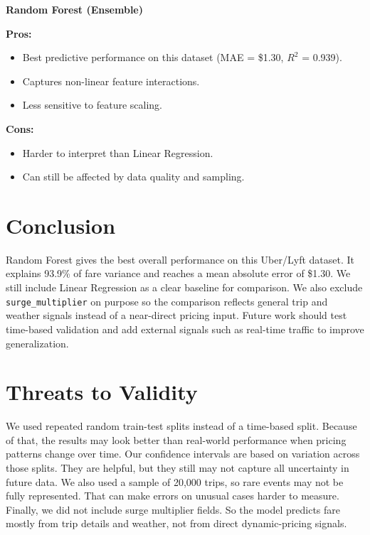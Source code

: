 \documentclass[conference]{IEEEtran}
\begin{document}
\textbf{Random Forest (Ensemble)}

\textbf{Pros:}
\begin{itemize}
	\item Best predictive performance on this dataset (MAE = \$1.30, $R^2$ = 0.939).
	\item Captures non-linear feature interactions.
	\item Less sensitive to feature scaling.
\end{itemize}

\textbf{Cons:}
\begin{itemize}
	\item Harder to interpret than Linear Regression.
	\item Can still be affected by data quality and sampling.
\end{itemize}

\section{Conclusion}
Random Forest gives the best overall performance on this Uber/Lyft dataset.
It explains 93.9\% of fare variance and reaches a mean absolute error of \$1.30.
We still include Linear Regression as a clear baseline for comparison.
We also exclude \texttt{surge\_multiplier} on purpose so the comparison reflects general trip and weather signals instead of a near-direct pricing input.
Future work should test time-based validation and add external signals such as real-time traffic to improve generalization.

\section{Threats to Validity}
We used repeated random train-test splits instead of a time-based split.
Because of that, the results may look better than real-world performance when pricing patterns change over time.
Our confidence intervals are based on variation across those splits.
They are helpful, but they still may not capture all uncertainty in future data.
We also used a sample of 20,000 trips, so rare events may not be fully represented.
That can make errors on unusual cases harder to measure.
Finally, we did not include surge multiplier fields.
So the model predicts fare mostly from trip details and weather, not from direct dynamic-pricing signals.
\end{document}
